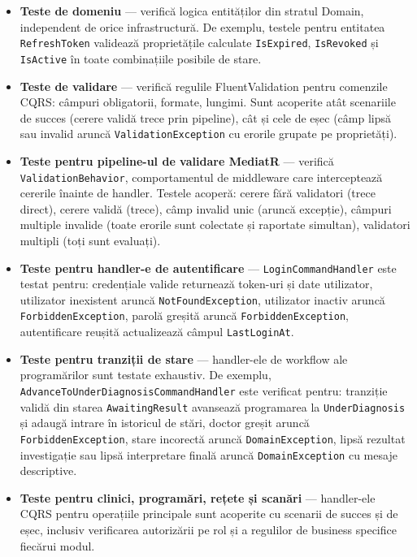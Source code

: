 \documentclass[12pt, a4paper]{report}
\begin{document}
\begin{itemize}
    \item \textbf{Teste de domeniu} --- verifică logica entităților din
          stratul Domain, independent de orice infrastructură. De exemplu,
          testele pentru entitatea \texttt{RefreshToken} validează
          proprietățile calculate \texttt{IsExpired}, \texttt{IsRevoked}
          și \texttt{IsActive} în toate combinațiile posibile de stare.

    \item \textbf{Teste de validare} --- verifică regulile FluentValidation
          pentru comenzile CQRS: câmpuri obligatorii, formate, lungimi.
          Sunt acoperite atât scenariile de succes (cerere validă trece
          prin pipeline), cât și cele de eșec (câmp lipsă sau invalid
          aruncă \texttt{ValidationException} cu erorile grupate pe
          proprietăți).

    \item \textbf{Teste pentru pipeline-ul de validare MediatR} ---
          verifică \texttt{ValidationBehavior}, comportamentul de
          middleware care interceptează cererile înainte de handler.
          Testele acoperă: cerere fără validatori (trece direct), cerere
          validă (trece), câmp invalid unic (aruncă excepție), câmpuri
          multiple invalide (toate erorile sunt colectate și raportate
          simultan), validatori multipli (toți sunt evaluați).

    \item \textbf{Teste pentru handler-e de autentificare} ---
          \texttt{LoginCommandHandler} este testat pentru: credențiale
          valide returnează token-uri și date utilizator, utilizator
          inexistent aruncă \texttt{NotFoundException}, utilizator
          inactiv aruncă \texttt{ForbiddenException}, parolă greșită
          aruncă \texttt{ForbiddenException}, autentificare reușită
          actualizează câmpul \texttt{LastLoginAt}.

    \item \textbf{Teste pentru tranziții de stare} --- handler-ele de
          workflow ale programărilor sunt testate exhaustiv. De exemplu,
          \texttt{AdvanceToUnderDiagnosisCommandHandler} este verificat
          pentru: tranziție validă din starea \texttt{AwaitingResult}
          avansează programarea la \texttt{UnderDiagnosis} și adaugă
          intrare în istoricul de stări, doctor greșit aruncă
          \texttt{ForbiddenException}, stare incorectă aruncă
          \texttt{DomainException}, lipsă rezultat investigație sau
          lipsă interpretare finală aruncă \texttt{DomainException}
          cu mesaje descriptive.

    \item \textbf{Teste pentru clinici, programări, rețete și scanări}
          --- handler-ele CQRS pentru operațiile principale sunt acoperite
          cu scenarii de succes și de eșec, inclusiv verificarea
          autorizării pe rol și a regulilor de business specifice fiecărui
          modul.
\end{itemize}
\end{document}
